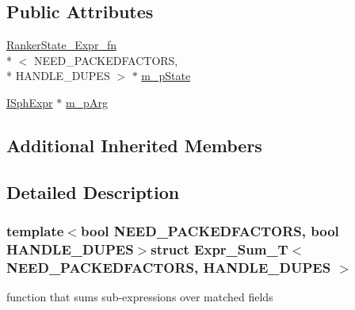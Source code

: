 \subsection*{Public Attributes}
\begin{DoxyCompactItemize}
\item 
\hyperlink{structRankerState__Expr__fn}{Ranker\-State\-\_\-\-Expr\-\_\-fn}\\*
$<$ N\-E\-E\-D\-\_\-\-P\-A\-C\-K\-E\-D\-F\-A\-C\-T\-O\-R\-S, \\*
H\-A\-N\-D\-L\-E\-\_\-\-D\-U\-P\-E\-S $>$ $\ast$ \hyperlink{structExpr__Sum__T_a3ac75c61ee084a38756ef3695840e4ef}{m\-\_\-p\-State}
\item 
\hyperlink{structISphExpr}{I\-Sph\-Expr} $\ast$ \hyperlink{structExpr__Sum__T_a41a00ec1616ae89c76a303a28821e1e6}{m\-\_\-p\-Arg}
\end{DoxyCompactItemize}
\subsection*{Additional Inherited Members}


\subsection{Detailed Description}
\subsubsection*{template$<$bool N\-E\-E\-D\-\_\-\-P\-A\-C\-K\-E\-D\-F\-A\-C\-T\-O\-R\-S, bool H\-A\-N\-D\-L\-E\-\_\-\-D\-U\-P\-E\-S$>$struct Expr\-\_\-\-Sum\-\_\-\-T$<$ N\-E\-E\-D\-\_\-\-P\-A\-C\-K\-E\-D\-F\-A\-C\-T\-O\-R\-S, H\-A\-N\-D\-L\-E\-\_\-\-D\-U\-P\-E\-S $>$}

function that sums sub-\/expressions over matched fields 

